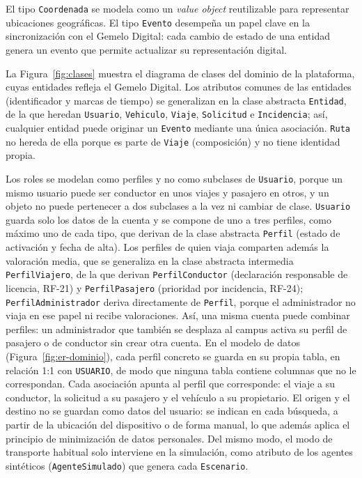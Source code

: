 El tipo \texttt{Coordenada} se modela como un \textit{value object} reutilizable para representar ubicaciones geográficas. El tipo \texttt{Evento} desempeña un papel clave en la sincronización con el Gemelo Digital: cada cambio de estado de una entidad genera un evento que permite actualizar su representación digital.

La Figura~\ref{fig:clases} muestra el diagrama de clases del dominio de la plataforma, cuyas entidades refleja el Gemelo Digital. Los atributos comunes de las entidades (identificador y marcas de tiempo) se generalizan en la clase abstracta \texttt{Entidad}, de la que heredan \texttt{Usuario}, \texttt{Vehiculo}, \texttt{Viaje}, \texttt{Solicitud} e \texttt{Incidencia}; así, cualquier entidad puede originar un \texttt{Evento} mediante una única asociación. \texttt{Ruta} no hereda de ella porque es parte de \texttt{Viaje} (composición) y no tiene identidad propia.

Los roles se modelan como perfiles y no como subclases de \texttt{Usuario}, porque un mismo usuario puede ser conductor en unos viajes y pasajero en otros, y un objeto no puede pertenecer a dos subclases a la vez ni cambiar de clase. \texttt{Usuario} guarda solo los datos de la cuenta y se compone de uno a tres perfiles, como máximo uno de cada tipo, que derivan de la clase abstracta \texttt{Perfil} (estado de activación y fecha de alta). Los perfiles de quien viaja comparten además la valoración media, que se generaliza en la clase abstracta intermedia \texttt{PerfilViajero}, de la que derivan \texttt{PerfilConductor} (declaración responsable de licencia, RF-21) y \texttt{PerfilPasajero} (prioridad por incidencia, RF-24); \texttt{PerfilAdministrador} deriva directamente de \texttt{Perfil}, porque el administrador no viaja en ese papel ni recibe valoraciones. Así, una misma cuenta puede combinar perfiles: un administrador que también se desplaza al campus activa su perfil de pasajero o de conductor sin crear otra cuenta. En el modelo de datos (Figura~\ref{fig:er-dominio}), cada perfil concreto se guarda en su propia tabla, en relación 1:1 con \texttt{USUARIO}, de modo que ninguna tabla contiene columnas que no le correspondan. Cada asociación apunta al perfil que corresponde: el viaje a su conductor, la solicitud a su pasajero y el vehículo a su propietario. El origen y el destino no se guardan como datos del usuario: se indican en cada búsqueda, a partir de la ubicación del dispositivo o de forma manual, lo que además aplica el principio de minimización de datos personales. Del mismo modo, el modo de transporte habitual solo interviene en la simulación, como atributo de los agentes sintéticos (\texttt{AgenteSimulado}) que genera cada \texttt{Escenario}.

